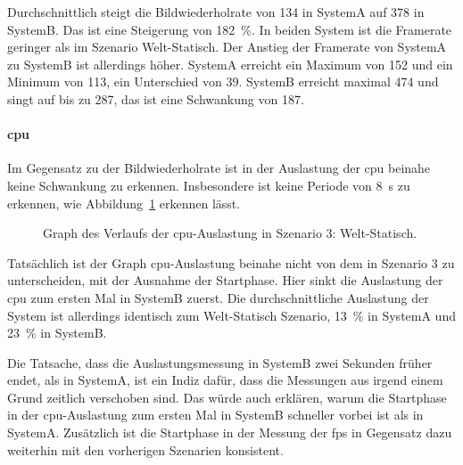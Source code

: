 Durchschnittlich steigt die Bildwiederholrate von \SI{134}{\fps} in SystemA auf \SI{378}{\fps} in SystemB. Das ist eine Steigerung von \SI{182}{\percent}. In beiden System ist die Framerate geringer als im Szenario Welt-Statisch. Der Anstieg der Framerate von SystemA zu SystemB ist allerdings höher. SystemA erreicht ein Maximum von \SI{152}{\fps} und ein Minimum von \SI{113}{\fps}, ein Unterschied von \SI{39}{\fps}. SystemB erreicht maximal \SI{474}{\fps} und singt auf bis zu \SI{287}{\fps}, das ist eine Schwankung von \SI{187}{\fps}.

\paragraph{\ac{cpu}}
Im Gegensatz zu der Bildwiederholrate ist in der Auslastung der \ac{cpu} beinahe keine Schwankung zu erkennen. Insbesondere ist keine Periode von \SI{8}{\second} zu erkennen, wie Abbildung~\ref{fig:seed-0-rotate-cpu} erkennen lässt.
\begin{figure}[!htbp]
	\caption[Graph des Verlaufs der -Auslastung in Szenario 4: Welt-Rotation.]{Graph des Verlaufs der \ac{cpu}-Auslastung in Szenario 3: Welt-Statisch.}\label{fig:seed-0-rotate-cpu}
\end{figure}
Tatsächlich ist der Graph \ac{cpu}-Auslastung beinahe nicht von dem in Szenario 3 zu unterscheiden, mit der Ausnahme der Startphase. Hier sinkt die Auslastung der \ac{cpu} zum ersten Mal in SystemB zuerst. Die durchschnittliche Auslastung der System ist allerdings identisch zum Welt-Statisch Szenario, \SI{13}{\percent} in SystemA und \SI{23}{\percent} in SystemB.

Die Tatsache, dass die Auslastungsmessung in SystemB zwei Sekunden früher endet, als in SystemA, ist ein Indiz dafür, dass die Messungen aus irgend einem Grund zeitlich verschoben sind. Das würde auch erklären, warum die Startphase in der \ac{cpu}-Auslastung zum ersten Mal in SystemB schneller vorbei ist als in SystemA. Zusätzlich ist die Startphase in der Messung der \ac{fps} in Gegensatz dazu weiterhin mit den vorherigen Szenarien konsistent. 

